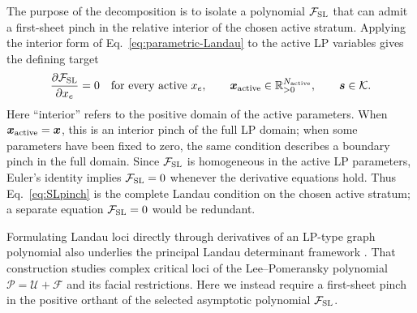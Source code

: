 \documentclass[a4paper,11pt]{article}
\newcommand{\x}{\boldsymbol{x}}
\newcommand{\s}{\boldsymbol{s}}
\newcommand{\K}{\mathcal K}
\newcommand{\FSL}{\mathcal F_{\rm SL}}
\newcommand{\Rpos}{\mathbb R_{>0}}
\begin{document}
The purpose of the decomposition is to isolate a polynomial \(\FSL\) that
can admit a first-sheet pinch in the relative interior of the chosen active
stratum.  Applying the interior form of Eq.~\eqref{eq:parametric-Landau} to the
active LP variables gives the defining target
\begin{equation}
 \frac{\partial\FSL}{\partial x_e}=0
 \quad\text{for every active }x_e,
 \qquad
 \x_{\rm active}\in\Rpos^{N_{\rm active}},
 \qquad
 \s\in\K.
\label{eq:SLpinch}
\end{equation}
Here ``interior'' refers to the positive domain of the active parameters.
When \(\x_{\rm active}=\x\), this is an interior pinch of the full LP domain;
when some parameters have been fixed to zero, the same condition describes a
boundary pinch in the full domain.  Since \(\FSL\) is homogeneous in the
active LP parameters, Euler's identity
implies \(\FSL=0\) whenever the derivative equations hold.  Thus
Eq.~\eqref{eq:SLpinch} is the complete Landau condition on the chosen active
stratum; a separate equation \(\FSL=0\) would be redundant.

Formulating Landau loci directly through derivatives of an LP-type graph
polynomial also underlies the principal Landau determinant framework
\cite{Fevola:2023pld}.  That construction studies complex critical loci of
the Lee--Pomeransky polynomial \(\mathcal P=\mathcal U+\mathcal F\) and its
facial restrictions.  Here we instead require a first-sheet pinch in the
positive orthant of the selected asymptotic polynomial \(\FSL\).
\end{document}
